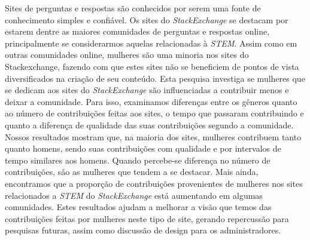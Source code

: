 Sites de perguntas e respostas são conhecidos por serem uma fonte de conhecimento simples e confiável. Os sites do \emph{StackExchange} se destacam por estarem dentre as maiores comunidades de perguntas e respostas online, principalmente se considerarmos aquelas relacionadas à \textit{STEM}. Assim como em outras comunidades online, mulheres são uma minoria nos sites do Stackexchange, fazendo com que estes sites não se beneficiem de pontos de vista diversificados na criação de seu conteúdo. Esta pesquisa investiga se mulheres que se dedicam aos sites do \emph{StackExchange} são influenciadas a contribuir menos e deixar a comunidade. Para isso, examinamos diferenças entre os gêneros quanto ao número de contribuições feitas aos sites, o tempo que passaram contribuindo e quanto a diferença de qualidade das suas contribuições segundo a comunidade. Nossos resultados mostram que, na maioria dos sites, mulheres contribuem tanto quanto homens, sendo suas contribuições com qualidade e por intervalos de tempo similares aos homens. Quando percebe-se diferença no número de contribuições, são as mulheres que tendem a se destacar. Mais ainda, encontramos que a proporção de contribuições provenientes de mulheres nos sites relacionados a \emph{STEM} do \emph{StackExchange} está aumentando em algumas comunidades. Estes resultados ajudam a melhorar a visão que temos das contribuições feitas por mulheres neste tipo de site, gerando repercussão para pesquisas futuras, assim como discussão de design para os administradores.

